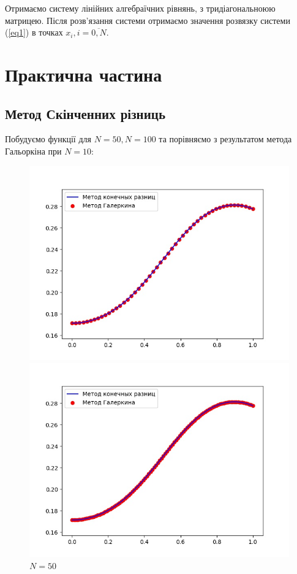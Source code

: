\documentclass[14pt,a4paper]{scrartcl}
\begin{document}
	Отримаємо систему лінійних алгебраїчних рівнянь, з тридіагональноюю матрицею. Після розв'язання системи отримаємо значення розвязку системи (\ref{eq1}) в точках $x_{i}, i = \overline{0,N}$.
	
	
	\section{Практична частина}
	
	\subsection{Метод Скінченних різниць}

	Побудуємо функції для $N = 50, N = 100$ та порівняємо з результатом метода Гальоркіна при $N = 10$:
	
	\begin{figure}[h]
		\begin{center}
			\begin{minipage}[h]{0.45\linewidth}
				\includegraphics[width=1\linewidth]{photo1.jpg}
				\caption{$N = 50$} %
				\label{ris:experimoriginal} %
			\end{minipage}
			\hfill
			\begin{minipage}[h]{0.45\linewidth}
				\includegraphics[width=1\linewidth]{photo2.jpg}

\end{minipage}
\end{center}
\end{figure}
\end{document}
